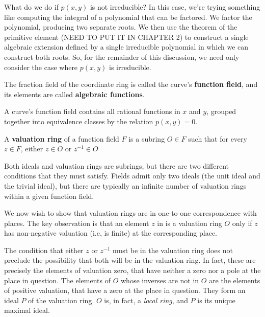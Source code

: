What do we do if $p(x,y)$ is not irreducible?  In this case, we're trying something
like computing the integral of a polynomial that can be factored.  We factor the
polynomial, producing two separate roots.  We then use the theorem of the
primitive element (NEED TO PUT IT IN CHAPTER 2) to construct a single algebraic
extension defined by a single irreducible polynomial in which we can construct
both roots.  So, for the remainder of this discussion, we need only consider the case
where $p(x,y)$ is irreducible.

\begin{definition}
The fraction field of the coordinate ring is called the curve's {\bf function field},
and its elements are called {\bf algebraic functions}.
\end{definition}

A curve's function field contains all rational functions in $x$ and $y$, grouped together into equivalence
classes by the relation $p(x,y)=0$.

\begin{definition}
A {\bf valuation ring} of a function field $F$ is a subring $O \in F$ such that
   for every $z \in F$, either $z \in O$ or $z^{-1} \in O$
\end{definition}

Both ideals and valuation rings are subrings, but there are two different conditions
that they must satisfy.  Fields admit only two ideals (the unit ideal and the trivial ideal),
but there are typically an infinite number of valuation rings within a given function field.

We now wish to show that valuation rings are in one-to-one correspondence with places.
The key observation is that an element $z$ in is a valuation ring $O$ only if $z$ has
non-negative valuation (i.e, is finite) at the corresponding place.

The condition that either $z$ or $z^{-1}$ must be in the valuation ring does not preclude
the possibility that both will be in the valuation ring.  In fact, these are precisely
the elements of valuation zero, that have neither a zero nor a pole at the place
in question.  The elements of $O$ whose inverses are not in $O$ are the elements of positive
valuation, that have a zero at the place in question.  They form an ideal $P$ of the
valuation ring.  $O$ is, in fact, a {\it local ring}, and $P$ is its unique maximal ideal.


